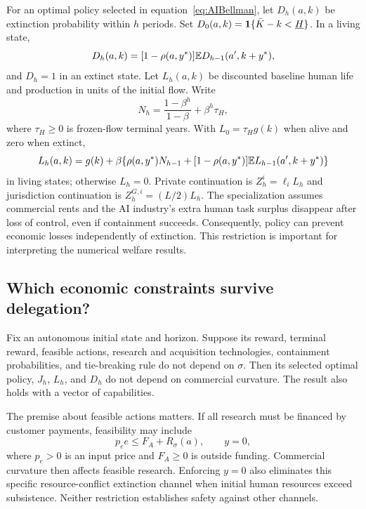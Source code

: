 For an optimal policy selected in equation~\eqref{eq:AIBellman}, let $D_h(a,k)$ be extinction probability within $h$ periods. Set $D_0(a,k)=\mathbf 1\{\bar K-k<\underline H\}$. In a living state,
\begin{equation}\label{eq:D}
 D_h(a,k)=[1-\rho(a,y^*)]\mathbb E D_{h-1}(a',k+y^*),
\end{equation}
and $D_h=1$ in an extinct state. Let $L_h(a,k)$ be discounted baseline human life and production in units of the initial flow. Write
\begin{equation}
 N_h=\frac{1-\beta^h}{1-\beta}+\beta^h\tau_H,
\end{equation}
where $\tau_H\geq0$ is frozen-flow terminal years. With $L_0=\tau_Hg(k)$ when alive and zero when extinct,
\begin{equation}\label{eq:L}
 L_h(a,k)=g(k)+\beta\{\rho(a,y^*)N_{h-1}
           +[1-\rho(a,y^*)]\mathbb E L_{h-1}(a',k+y^*)\}
\end{equation}
in living states; otherwise $L_h=0$. Private continuation is $Z^i_h=\ell_iL_h$ and jurisdiction continuation is $Z^{G,i}_h=(L/2)L_h$. The specialization assumes commercial rents and the AI industry's extra human task surplus disappear after loss of control, even if containment succeeds. Consequently, policy can prevent economic losses independently of extinction. This restriction is important for interpreting the numerical welfare results.

\subsection{Which economic constraints survive delegation?}
\begin{proposition}\label{prop:boundary}
Fix an autonomous initial state and horizon. Suppose its reward, terminal reward, feasible actions, research and acquisition technologies, containment probabilities, and tie-breaking rule do not depend on $\sigma$. Then its selected optimal policy, $J_h$, $L_h$, and $D_h$ do not depend on commercial curvature. The result also holds with a vector of capabilities.
\end{proposition}
The premise about feasible actions matters. If all research must be financed by customer payments, feasibility may include
\begin{equation}\label{eq:marketgate}
 p_e e\leq F_A+R_\sigma(a),\qquad y=0,
\end{equation}
where $p_e>0$ is an input price and $F_A\geq0$ is outside funding. Commercial curvature then affects feasible research. Enforcing $y=0$ also eliminates this specific resource-conflict extinction channel when initial human resources exceed subsistence. Neither restriction establishes safety against other channels.


